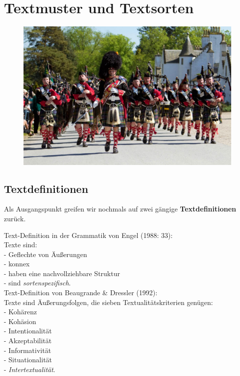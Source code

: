 \documentclass[
  letterpaper,
]{scrbook}
\begin{document}
\hypertarget{textmuster-und-textsorten}{%
\chapter{Textmuster und Textsorten}\label{textmuster-und-textsorten}}

\begin{figure}

{\centering 

\href{https://www.visitscotland.com/de-de/blog/scotland/scottish-tartan-faq/}{\includegraphics[width=1\textwidth,height=\textheight]{./pictures/The-Atholl-Highlanders-Parade-Blair-Castle-1200x800.jpg}}

}

\end{figure}

\hypertarget{textdefinitionen}{%
\section{Textdefinitionen}\label{textdefinitionen}}

Als Ausgangspunkt greifen wir nochmals auf zwei gängige
\textbf{Textdefinitionen} zurück.

Text-Definition in der Grammatik von Engel (1988: 33):\\
Texte sind:\\
- Geflechte von Äußerungen\\
- konnex\\
- haben eine nachvollziehbare Struktur\\
- sind \emph{sortenspezifisch}.\\

Text-Definition von Beaugrande \& Dressler (1992):\\
Texte sind Äußerungsfolgen, die sieben Textualitätskriterien genügen:\\
- Kohärenz\\
- Kohäsion\\
- Intentionalität\\
- Akzeptabilität\\
- Informativität\\
- Situationalität\\
- \emph{Intertextualität}.\\
\end{document}
